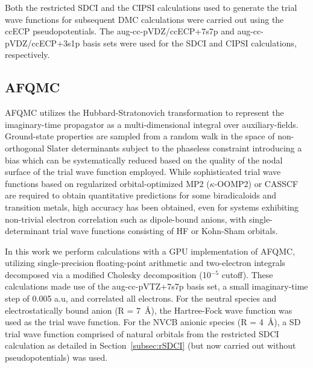 Both the restricted SDCI and the CIPSI calculations used to generate the trial wave functions for subsequent DMC calculations were carried out using the ccECP pseudopotentials.
The aug-cc-pVDZ/ccECP+7s7p and aug-cc-pVDZ/ccECP+3s1p basis sets were used for the SDCI and CIPSI calculations, respectively.

\subsection{AFQMC}

AFQMC\cite{10.1103/PhysRevD.24.2278, 10.1016/0003-49168690107-7, 10.1103/PhysRevB.24.4295, 10.1103/PhysRevLett.90.136401, 10.1103/PhysRevB.55.7464,10.1002/wcms.1364,10.1007/978-3-319-42913-7_47-1} utilizes the Hubbard-Stratonovich transformation \cite{10.1103/PhysRevLett.3.77} to represent the imaginary-time propagator as a multi-dimensional integral over auxiliary-fields. 
Ground-state properties are sampled from a random walk in the space of non-orthogonal Slater determinants subject to the phaseless constraint\cite{10.1063/1.4995643} introducing a bias which can be systematically reduced based on the quality of the nodal surface of the trial wave function employed.
While sophisticated trial wave functions based on regularized orbital-optimized MP2 ($\kappa$-OOMP2)\cite{10.1021/acs.jctc.0c00055} or CASSCF\cite{10.1021/acs.jctc.0c00070,10.1021/acs.jctc.9b00083,10.1021/jacs.0c02360} are required to obtain quantitative predictions for some biradicaloids and transition metals, high accuracy has been obtained, even for systems exhibiting non-trivial electron correlation such as dipole-bound anions,\cite{10.1021/acs.jpclett.8b02733} with single-determinant trial wave functions consisting of HF or Kohn-Sham orbitals.\cite{10.1021/acs.jpclett.8b02733,10.1021/acs.jctc.9b00534}

In this work we perform calculations with a GPU implementation of AFQMC,\cite{10.1021/acs.jctc.8b00342}
utilizing single-precision floating-point arithmetic and two-electron integrals decomposed via a modified Cholesky decomposition (10$^{-5}$ cutoff).\cite{10.1063/1.3654002} 
These calculations made use of the aug-cc-pVTZ+7s7p basis set, a small imaginary-time step of 0.005 a.u, and correlated all electrons.
For the neutral species and electrostatically bound anion (R = \SI{7}{\angstrom}), the Hartree-Fock wave function was used as the trial wave function.
For the NVCB anionic species (R = \SI{4}{\angstrom}), a SD trial wave function comprised of natural orbitals from the restricted SDCI calculation as detailed in Section~\ref{subsec:rSDCI} (but now carried out without pseudopotentials) was used.

